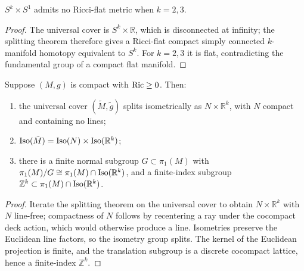 \begin{corollary}
  \label{cor:pet-ch7-no-ricci-flat-sphere-product}
  $S^k\times S^1$ admits no Ricci-flat metric when $k=2,3$.
\end{corollary}
\begin{proof}
  \sketch
  The universal cover is \(S^k\times\mathbb R\), which is disconnected at infinity; the splitting theorem therefore gives a Ricci-flat compact simply connected \(k\)-manifold homotopy equivalent to \(S^k\). For \(k=2,3\) it is flat, contradicting the fundamental group of a compact flat manifold.
\end{proof}

\begin{theorem}
  \label{thm:pet-ch7-structure-theorem}
  Suppose $(M,g)$ is compact with $\operatorname{Ric}\ge0$. Then:
  \begin{enumerate}
    \item[(1)] the universal cover $(\tilde M,\tilde g)$ splits isometrically
      as $N\times\mathbb{R}^k$, with $N$ compact and containing no lines;
    \item[(2)] $\mathrm{Iso}(\tilde M)=\mathrm{Iso}(N)\times\mathrm{Iso}(\mathbb{R}^k)$;
    \item[(3)] there is a finite normal subgroup $G\subset\pi_1(M)$ with
      $\pi_1(M)/G\cong\pi_1(M)\cap\mathrm{Iso}(\mathbb{R}^k)$, and a finite-index subgroup
      $\mathbb{Z}^k\subset\pi_1(M)\cap\mathrm{Iso}(\mathbb{R}^k)$.
  \end{enumerate}
\end{theorem}
\begin{proof}
  \sketch
  Iterate the splitting theorem on the universal cover to obtain \(N\times\mathbb R^k\) with \(N\) line-free; compactness of \(N\) follows by recentering a ray under the cocompact deck action, which would otherwise produce a line. Isometries preserve the Euclidean line factors, so the isometry group splits. The kernel of the Euclidean projection is finite, and the translation subgroup is a discrete cocompact lattice, hence a finite-index \(\mathbb Z^k\).
\end{proof}

